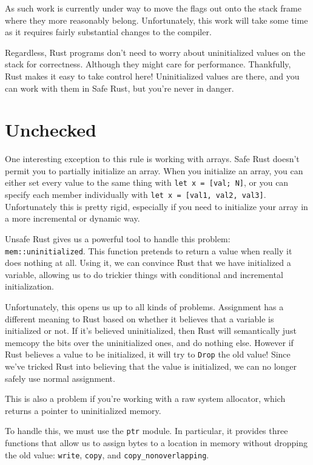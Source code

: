 \documentclass[a4paper,]{book}
\begin{document}
As such work is currently under way to move the flags out onto the stack
frame where they more reasonably belong. Unfortunately, this work will
take some time as it requires fairly substantial changes to the
compiler.

Regardless, Rust programs don't need to worry about uninitialized values
on the stack for correctness. Although they might care for performance.
Thankfully, Rust makes it easy to take control here! Uninitialized
values are there, and you can work with them in Safe Rust, but you're
never in danger.

\section{Unchecked}\label{sec--unchecked-uninit}

One interesting exception to this rule is working with arrays. Safe Rust
doesn't permit you to partially initialize an array. When you initialize
an array, you can either set every value to the same thing with
\texttt{let\ x\ =\ {[}val;\ N{]}}, or you can specify each member
individually with \texttt{let\ x\ =\ {[}val1,\ val2,\ val3{]}}.
Unfortunately this is pretty rigid, especially if you need to initialize
your array in a more incremental or dynamic way.

Unsafe Rust gives us a powerful tool to handle this problem:
\texttt{mem::uninitialized}. This function pretends to return a value
when really it does nothing at all. Using it, we can convince Rust that
we have initialized a variable, allowing us to do trickier things with
conditional and incremental initialization.

Unfortunately, this opens us up to all kinds of problems. Assignment has
a different meaning to Rust based on whether it believes that a variable
is initialized or not. If it's believed uninitialized, then Rust will
semantically just memcopy the bits over the uninitialized ones, and do
nothing else. However if Rust believes a value to be initialized, it
will try to \texttt{Drop} the old value! Since we've tricked Rust into
believing that the value is initialized, we can no longer safely use
normal assignment.

This is also a problem if you're working with a raw system allocator,
which returns a pointer to uninitialized memory.

To handle this, we must use the \texttt{ptr} module. In particular, it
provides three functions that allow us to assign bytes to a location in
memory without dropping the old value: \texttt{write}, \texttt{copy},
and \texttt{copy\_nonoverlapping}.
\end{document}
